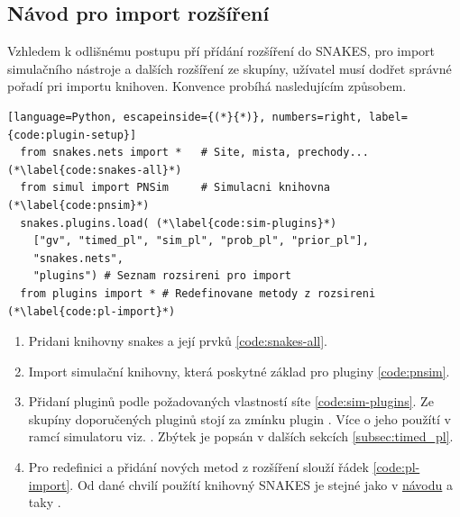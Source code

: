 \subsection{Návod pro import rozšíření}
Vzhledem k odlišnému postupu pří přídání rozšíření do SNAKES, pro import simulačního nástroje a dalších rozšíření ze skupíny, užívatel musí dodřet správné pořadí pri importu knihoven. Konvence probíhá nasledujícím způsobem.

\begin{lstlisting}[language=Python, escapeinside={(*}{*)}, numbers=right, label={code:plugin-setup}]
  from snakes.nets import *   # Site, mista, prechody... (*\label{code:snakes-all}*)
  from simul import PNSim     # Simulacni knihovna (*\label{code:pnsim}*)
  snakes.plugins.load( (*\label{code:sim-plugins}*)
    ["gv", "timed_pl", "sim_pl", "prob_pl", "prior_pl"],
    "snakes.nets",
    "plugins") # Seznam rozsireni pro import
  from plugins import * # Redefinovane metody z rozsireni (*\label{code:pl-import}*)
\end{lstlisting}

\begin{enumerate}
  \item Pridani knihovny snakes a její prvků \ref{code:snakes-all}.
  \item Import simulační knihovny, která poskytné základ pro pluginy \ref{code:pnsim}.
  \item Přidaní pluginů podle požadovaných vlastností síte \ref{code:sim-plugins}. Ze skupíny doporučených pluginů stojí za zmínku plugin \href{https://www.ibisc.univ-evry.fr/~fpommereau/SNAKES/API/plugins/gv.html}{}. Více o jeho použítí v ramcí simulatoru viz. \todo{}. Zbýtek je popsán v dalších sekcích \ref{subsec:timed_pl}.
  \item Pro redefinici a přidání nových metod z rozšíření slouží řádek \ref{code:pl-import}. Od dané chvilí použítí knihovný SNAKES je stejné jako v \href{https://www.ibisc.univ-evry.fr/~fpommereau/SNAKES/first-steps-with-snakes.html}{návodu} a taky .
\end{enumerate}

